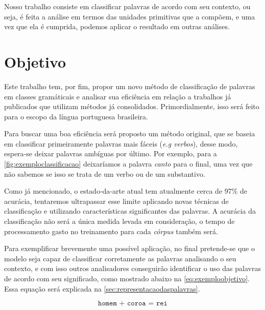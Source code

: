 Nosso trabalho consiste em classificar palavras de acordo com seu contexto, ou seja, é feita a análise em termos das unidades primitivas que a compõem, e uma vez que ela é cumprida, podemos aplicar o resultado em outras análises.


\section{Objetivo}\label{sec:objetivo}

Este trabalho tem, por fim, propor um novo método de classificação de palavras em classes gramáticais e analisar sua eficiência em relação a trabalhos já publicados que utilizam métodos já consolidados. Primordialmente, isso será feito para o escopo da língua portuguesa brasileira. 

Para buscar uma boa eficiência será proposto um método original, que se baseia em classificar primeiramente palavras mais fáceis (\textit{e.g verbos}), desse modo, espera-se deixar palavras ambíguas por último. Por exemplo, para a \autoref{fig:exemploclassificacao} deixaríamos a palavra \textit{canto} para o final, uma vez que não sabemos se isso se trata de um verbo ou de um substantivo.  

Como já mencionado, o estado-da-arte atual tem atualmente cerca de 97\% de acurácia, tentaremos ultrapassar esse limite aplicando novas técnicas de classificação e utilizando características significantes das palavras. A acurácia da classificação não será a única medida levada em consideração, o tempo de processamento gasto no treinamento para cada \textit{córpus} também será.

Para exemplificar brevemente uma possível aplicação, no final pretende-se que o modelo seja capaz de classificar corretamente as palavras analisando o seu contexto, e com isso outros analisadores conseguirão identificar o uso das palavras de acordo com seu significado, como mostrado abaixo na \autoref{eq:exemploobjetivo}. Essa equação será explicada na \autoref{sec:representacaodaspalavras}.

\begin{equation}
\texttt{homem + coroa = rei} \label{eq:exemploobjetivo}
\end{equation}



